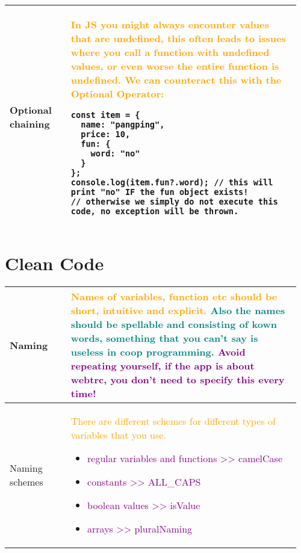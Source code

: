 \documentclass[main.tex,fontsize=8pt,paper=a4,paper=portrait,DIV=calc,]{scrartcl}
\begin{document}
\begin{table}[ht!]
\begin{tabular}{|m{0.2\linewidth}|m{0.755\linewidth}|}
\hline
Optional chaining & 
\textcolor{orange}{In JS you might always encounter values that are undefined, this often leads to issues where you call a function with undefined values, or even worse the entire function is undefined.\newline
We can counteract this with the Optional Operator:}\newline
\begin{lstlisting}
const item = {
  name: "pangping",
  price: 10, 
  fun: {
    word: "no"
  }
};
console.log(item.fun?.word); // this will print "no" IF the fun object exists!
// otherwise we simply do not execute this code, no exception will be thrown.
\end{lstlisting}\\
\hline
\end{tabular}
\section{Clean Code}
\begin{tabular}{|m{0.2\linewidth}|m{0.755\linewidth}|}
\hline
Naming & 
\textcolor{orange}{Names of variables, function etc should be \textbf{short, intuitive and explicit}.}\newline
\textcolor{teal}{Also the names should be \textbf{spellable} and consisting of \textbf{kown words}, something that you can't say is useless in coop programming.}\newline
\textcolor{purple}{Avoid repeating yourself, if the app is about webtrc, you don't need to specify this every time!}\\
\hline
Naming schemes & 
\textcolor{orange}{There are different schemes for different types of variables that you use.}\newline
\begin{itemize}
\item \textcolor{purple}{regular variables and functions >> camelCase}
\item \textcolor{purple}{constants >> ALL\_CAPS}
\item \textcolor{purple}{boolean values >> isValue}
\item \textcolor{purple}{arrays >> pluralNaming}
\vspace{-2mm}
\end{itemize}\\ 
\hline

\hline

\hline

\hline

\hline

\hline

\hline
\end{tabular}
\end{table}
\end{document}
